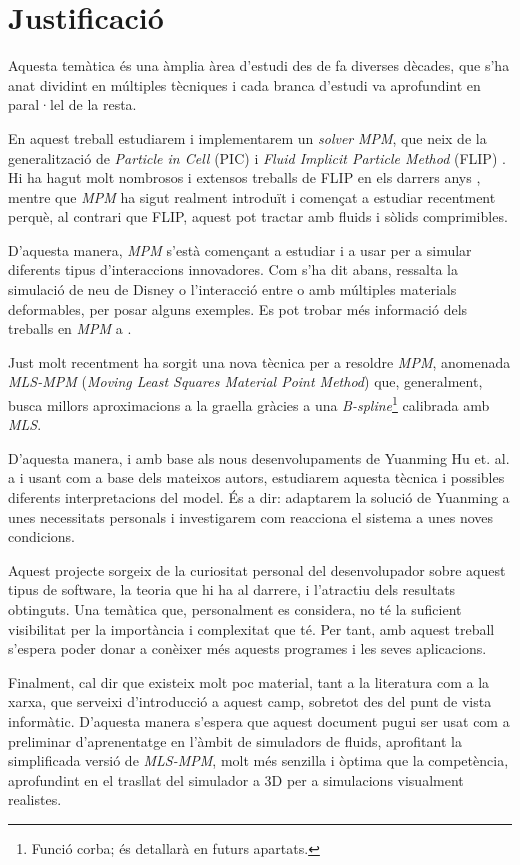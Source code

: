 \documentclass[a4paper]{article} %
\begin{document}
	\section{Justificació}
	Aquesta temàtica és una àmplia àrea d'estudi des de fa diverses dècades, que s'ha anat dividint en múltiples tècniques i cada branca d'estudi va aprofundint en paral·lel de la resta.
	\par
	En aquest treball estudiarem i implementarem un \textit{solver} \textit{MPM}, que neix de la generalització de \textit{Particle in Cell} (PIC) i \textit{Fluid Implicit Particle Method} (FLIP) \cite{Sulsky1995}. Hi ha hagut molt nombrosos i extensos treballs de FLIP en els darrers anys \cite{Bridson2018,Zhu2005}, mentre que \textit{MPM} ha sigut realment introduït i començat a estudiar recentment perquè, al contrari que FLIP, aquest pot tractar amb fluids i sòlids comprimibles.
	\par
	D'aquesta manera, \textit{MPM} s'està començant a estudiar i a usar per a simular diferents tipus d'interaccions innovadores. Com s'ha dit abans, ressalta la simulació de neu de Disney \cite{Stomakhin} o l'interacció entre o amb múltiples materials deformables\cite{Hegemann2013}, per posar alguns exemples. Es pot trobar més informació dels treballs en \textit{MPM} a \cite{Jiang2016}.
	\par
	Just molt recentment ha sorgit una nova tècnica per a resoldre \textit{MPM}, anomenada \textit{MLS-MPM} (\textit{Moving Least Squares Material Point Method})\cite{hu2018mlsmpmcpic} que, generalment, busca millors aproximacions a la graella gràcies a una \textit{B-spline}\footnote{Funció corba; és detallarà en futurs apartats.} calibrada amb \textit{MLS}.
	\par
	D'aquesta manera, i amb base als nous desenvolupaments de Yuanming Hu et. al. a \cite{hu2018mlsmpmcpic} i usant com a base \cite{Hu} dels mateixos autors, estudiarem aquesta tècnica i possibles diferents interpretacions del model. És a dir: adaptarem la solució de Yuanming a unes necessitats personals i investigarem com reacciona el sistema a unes noves condicions.
	\par 
	Aquest projecte sorgeix de la curiositat personal del desenvolupador sobre aquest tipus de software, la teoria que hi ha al darrere, i l'atractiu dels resultats obtinguts. Una temàtica que, personalment es considera, no té la suficient visibilitat per la importància i complexitat que té. Per tant, amb aquest treball s'espera poder donar a conèixer més aquests programes i les seves aplicacions.
	\par
	Finalment, cal dir que existeix molt poc material, tant a la literatura com a la xarxa, que serveixi d'introducció a aquest camp, sobretot des del punt de vista informàtic. D'aquesta manera s'espera que aquest document pugui ser usat com a preliminar d'aprenentatge en l'àmbit de simuladors de fluids, aprofitant la simplificada versió de \textit{MLS-MPM}, molt més senzilla i òptima que la competència, aprofundint en el trasllat del simulador a 3D per a simulacions visualment realistes.
	
\end{document}
